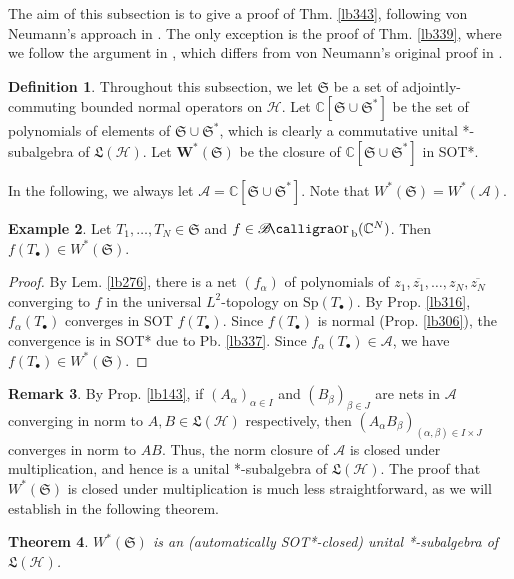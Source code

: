 \documentclass[12pt,b5paper,notitlepage]{article}
\theoremstyle{definition}
\newtheorem{df}{Definition}[subsection]
\newtheorem{eg}[df]{Example}
\newtheorem{rem}[df]{Remark}
\theoremstyle{plain}
\newtheorem{thm}[df]{Theorem}
\DeclareMathOperator{\Borb}{{\mathscr{B}\text{\kern -2pt {\calligra\large or}}\,}_{\mathrm b}}
\newcommand{\fk}{\mathfrak}
\newcommand{\ovl}{\overline}
\newcommand{\blt}{\bullet}
\newcommand{\Cbb}{\mathbb C}
\newcommand{\Sp}{\mathrm{Sp}}
\newcommand{\MH}{\mathcal H}
\newcommand{\SA}{\mathscr A}
\numberwithin{equation}{section}
\begin{document}
The aim of this subsection is to give a proof of Thm. \ref{lb343}, following von Neumann's approach in \cite{vN31}. The only exception is the proof of Thm. \ref{lb339}, where we follow the argument in \cite[Lem. II.2.8]{Dav}, which differs from von Neumann's original proof in \cite{vN29b}.






\begin{df}\label{lb336}
Throughout this subsection, we let $\fk S$ be a set of adjointly-commuting bounded normal operators on $\MH$. Let $\pmb{\Cbb[\fk S\cup\fk S^*]}$ be the set of polynomials of elements of $\fk S\cup\fk S^*$, which is clearly a commutative unital *-subalgebra of $\fk L(\MH)$. Let $\pmb {W^*(\fk S)}$ be the closure of $\Cbb[\fk S\cup\fk S^*]$ in SOT*.
\end{df}

In the following, we always let $\SA=\Cbb[\fk S\cup\fk S^*]$. Note that $W^*(\fk S)=W^*(\SA)$.

\begin{eg}\label{lb340}
Let $T_1,\dots,T_N\in\fk S$ and $f\in\Borb(\Cbb^N)$. Then $f(T_\blt)\in W^*(\fk S)$.
\end{eg}


\begin{proof}
By Lem. \ref{lb276}, there is a net $(f_\alpha)$ of polynomials of $z_1,\ovl{z_1},\dots,z_N,\ovl{z_N}$ converging to $f$ in the universal $L^2$-topology on $\Sp(T_\blt)$. By Prop. \ref{lb316}, $f_\alpha(T_\blt)$ converges in SOT $f(T_\blt)$. Since $f(T_\blt)$ is normal (Prop. \ref{lb306}), the convergence is in SOT* due to Pb. \ref{lb337}. Since $f_\alpha(T_\blt)\in\SA$, we have $f(T_\blt)\in W^*(\fk S)$.
\end{proof}


\begin{rem}
By Prop. \ref{lb143}, if $(A_\alpha)_{\alpha\in I}$ and $(B_\beta)_{\beta\in J}$ are nets in $\SA$ converging in norm to $A,B\in\fk L(\MH)$ respectively, then $(A_\alpha B_\beta)_{(\alpha,\beta)\in I\times J}$ converges in norm to $AB$. Thus, the norm closure of $\SA$ is closed under multiplication, and hence is a unital *-subalgebra of $\fk L(\MH)$. The proof that $W^*(\fk S)$ is closed under multiplication is much less straightforward, as we will establish in the following theorem.
\end{rem}


\begin{thm}\label{lb338}
$W^*(\fk S)$ is an (automatically SOT*-closed) unital *-subalgebra of $\fk L(\MH)$.
\end{thm}
\end{document}
